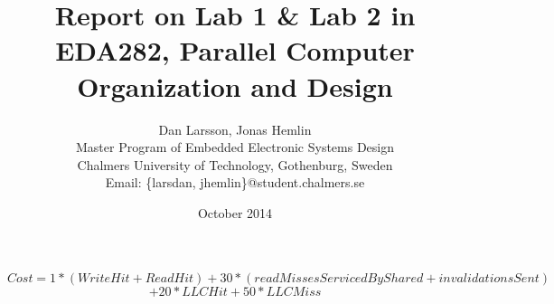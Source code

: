 \documentclass[a4paper]{article}
\title{Report on Lab 1 \& Lab 2 in EDA282, Parallel Computer Organization and Design}
\date{October 2014}
\author{Dan Larsson, Jonas Hemlin
\\Master Program of Embedded Electronic Systems Design\\
Chalmers University of Technology, Gothenburg, Sweden\\
Email: \{larsdan, jhemlin\}@student.chalmers.se}
\begin{document}
\maketitle
$$ Cost = 1 * (WriteHit+ReadHit) + 30 * (readMissesServicedByShared + invalidationsSent)$$ $$+ 20 * LLCHit + 50 * LLCMiss $$




\newpage
{}
\end{document}
